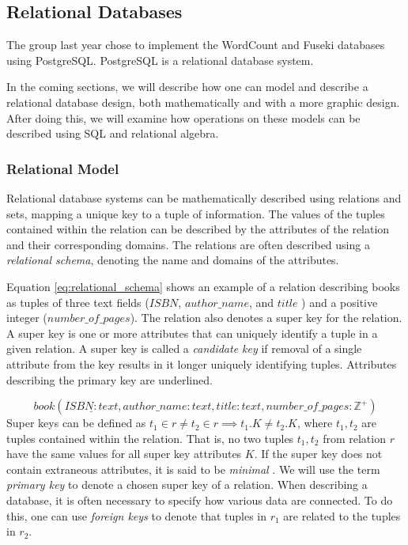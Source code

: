 \subsection{Relational Databases}\label{relational_databases}
The group last year chose to implement the WordCount and Fuseki databases using PostgreSQL.
PostgreSQL is a relational database system\cite{knox2020}.

In the coming sections, we will describe how one can model and describe a relational database design, both mathematically and with a more graphic design.
After doing this, we will examine how operations on these models can be described using SQL and relational algebra.

\subsubsection*{Relational Model}
Relational database systems can be mathematically described using relations and sets, mapping a unique key to a tuple of information\cite{DBSBook}.
The values of the tuples contained within the relation can be described by the attributes of the relation and their corresponding domains\cite{KatjaFirstPP}. 
The relations are often described using a \textit{relational schema}, denoting the name and domains of the attributes.


Equation \ref{eq:relational_schema} shows an example of a relation describing books as tuples of three text fields ($ISBN$, $author\_name$, and $title$ ) and a positive integer ($number\_of\_pages$).
The relation also denotes a super key for the relation. A super key is one or more attributes that can uniquely identify a tuple in a given relation.
A super key is called a \textit{candidate key} if removal of a single attribute from the key results in it longer uniquely identifying tuples.
Attributes describing the primary key are underlined.

\begin{equation} \label{eq:relational_schema}
    book(\underline{ISBN: text}, author\_name:text, title: text, number\_of\_pages:\mathbb{Z}^+)
\end{equation}
Super keys can be defined as $t_1 \in r\neq t_2 \in r \implies t_1.K \neq t_2.K$, where $t_1, t_2$ are tuples contained within the relation.
That is, no two tuples $t_1, t_2$ from relation $r$ have the same values for all super key attributes $K$. 
If the super key does not contain extraneous attributes, it is said to be \textit{minimal} \cite{DBSBook}.
We will use the term \textit{primary key} to denote a chosen super key of a relation. 
When describing a database, it is often necessary to specify how various data are connected. 
To do this, one can use \textit{foreign keys} to denote that tuples in $r_1$ are related to the tuples in $r_2$.


